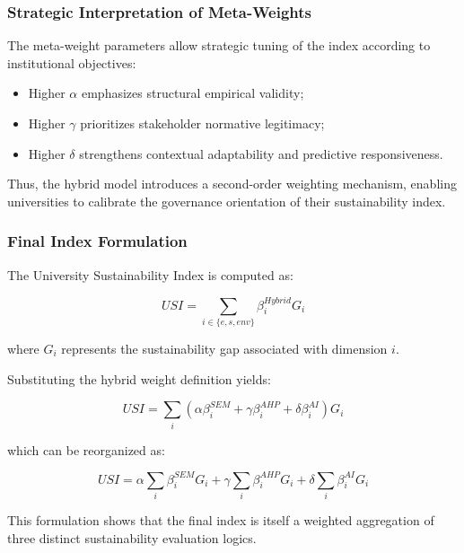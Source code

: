 \documentclass[11pt,a4paper]{article}
\begin{document}
\subsubsection{Strategic Interpretation of Meta-Weights}

The meta-weight parameters allow strategic tuning of the index according to institutional objectives:

\begin{itemize}
\item Higher $\alpha$ emphasizes structural empirical validity;
\item Higher $\gamma$ prioritizes stakeholder normative legitimacy;
\item Higher $\delta$ strengthens contextual adaptability and predictive responsiveness.
\end{itemize}

Thus, the hybrid model introduces a second-order weighting mechanism, enabling universities to calibrate the governance orientation of their sustainability index.

\subsubsection{Final Index Formulation}

The University Sustainability Index is computed as:

\begin{equation}
USI =
\sum_{i \in \{e,s,env\}}
\beta_i^{Hybrid} G_i
\end{equation}

where $G_i$ represents the sustainability gap associated with dimension $i$.

Substituting the hybrid weight definition yields:

\begin{equation}
USI =
\sum_{i}
\left(
\alpha \beta_i^{SEM}
+
\gamma \beta_i^{AHP}
+
\delta \beta_i^{AI}
\right) G_i
\end{equation}

which can be reorganized as:

\begin{equation}
USI =
\alpha \sum_{i} \beta_i^{SEM} G_i
+
\gamma \sum_{i} \beta_i^{AHP} G_i
+
\delta \sum_{i} \beta_i^{AI} G_i
\end{equation}

This formulation shows that the final index is itself a weighted aggregation of three distinct sustainability evaluation logics.
\end{document}
